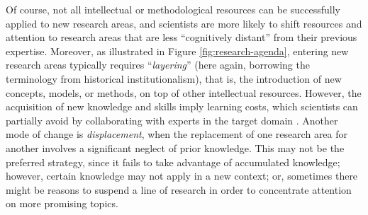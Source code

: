 \documentclass{article}
\begin{document}
Of course, not all intellectual or methodological resources can be successfully applied to new research areas, and scientists are more likely to shift resources and attention to research areas that are less ``cognitively distant'' from their previous expertise. Moreover, as illustrated in Figure \ref{fig:research-agenda}, entering new research areas typically requires ``\textit{layering}'' (here again, borrowing the terminology from historical institutionalism), that is, the introduction of new concepts, models, or methods, on top of other intellectual resources. However, the acquisition of new knowledge and skills imply learning costs, which scientists can partially avoid by collaborating with experts in the target domain \citep{Tripodi2020}. Another mode of change is \textit{displacement}, when the replacement of one research area for another involves a significant neglect of prior knowledge. %
This may not be the preferred strategy, since it fails to take advantage of accumulated knowledge; however, certain knowledge may not apply in a new context; or, sometimes there might be reasons to suspend a line of research in order to concentrate attention on more promising topics. 
\end{document}
